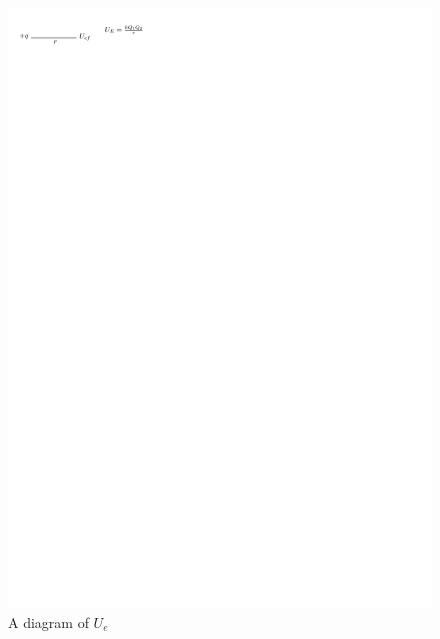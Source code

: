 \documentclass{article}
\begin{document}
\begin{itemize}
\begin{figure}[H]
          \includegraphics{figures/calculating-ue.pdf}
          \caption{A diagram of $U_e$}
        \end{figure}
    \end{itemize}
\end{document}
